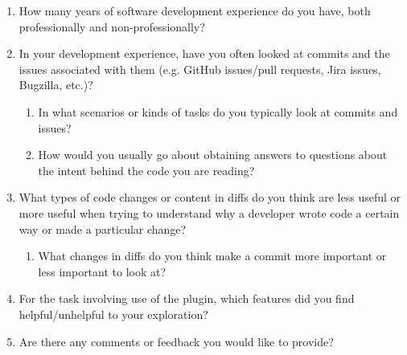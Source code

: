 \begin{enumerate}
    \item How many years of software development experience do you have, both professionally and non-professionally?
    \item In your development experience, have you often looked at commits and the issues associated with them (e.g. GitHub issues/pull requests, Jira issues, Bugzilla, etc.)?
        \begin{enumerate}
            \item In what scenarios or kinds of tasks do you typically look at commits and issues?
            \item How would you usually go about obtaining answers to questions about the intent behind the code you are reading?
        \end{enumerate}
    \item What types of code changes or content in diffs do you think are less useful or more useful when trying to understand why a developer wrote code a certain way or made a particular change? 
        \begin{enumerate}
            \item What changes in diffs do you think make a commit more important or less important to look at?
        \end{enumerate}
    \item For the task involving use of the plugin, which features did you find helpful/unhelpful to your exploration?
    \item Are there any comments or feedback you would like to provide?
\end{enumerate}

\endinput

This would be any supporting material not central to the dissertation.
For example:
\begin{itemize}
\item additional details of methodology and/or data;
\item diagrams of specialized equipment developed.;
\item copies of questionnaires and survey instruments.
\end{itemize}